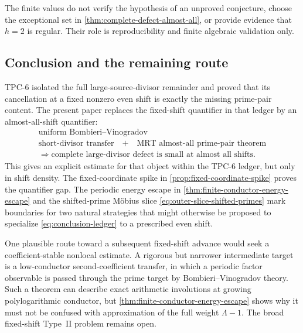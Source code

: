 \begin{remark}
The finite values do not verify the hypothesis of an unproved conjecture,
choose the exceptional set in \cref{thm:complete-defect-almost-all}, or
provide evidence that $h=2$ is regular.  Their role is reproducibility and
finite algebraic validation only.
\end{remark}

\subsection{Conclusion and the remaining route}
\label{subsec:conclusion}

TPC-6 isolated the full large-source-divisor remainder and proved that its
cancellation at a fixed nonzero even shift is exactly the missing prime-pair
content.  The present paper replaces the fixed-shift quantifier in that
ledger by an almost-all-shift quantifier:
\begin{equation}\label{eq:conclusion-ledger}
\begin{gathered}
\text{uniform Bombieri--Vinogradov}\\[-2pt]
\text{short-divisor transfer}
\quad+\quad
\text{MRT almost-all prime-pair theorem}
\\
\Longrightarrow
\text{complete large-divisor defect is small at almost all shifts}.
\end{gathered}
\end{equation}
This gives an explicit estimate for that object within the TPC-6 ledger, but
only in shift density.  The fixed-coordinate spike in
\cref{prop:fixed-coordinate-spike} proves the quantifier gap.  The periodic
energy escape in \cref{thm:finite-conductor-energy-escape} and the
shifted-prime M\"obius slice \eqref{eq:outer-slice-shifted-primes} mark
boundaries for two natural strategies that might otherwise be proposed to
specialize \eqref{eq:conclusion-ledger} to a prescribed even shift.

One plausible route toward a subsequent fixed-shift advance would seek a
coefficient-stable nonlocal estimate.  A rigorous but narrower intermediate
target is a low-conductor second-coefficient transfer, in which a periodic
factor observable is passed through the prime target by
Bombieri--Vinogradov theory.  Such a theorem can describe exact arithmetic
involutions at growing polylogarithmic conductor, but
\cref{thm:finite-conductor-energy-escape} shows why it must not be confused
with approximation of the full weight $\Lambda-1$.  The broad fixed-shift
Type~II problem remains open.
